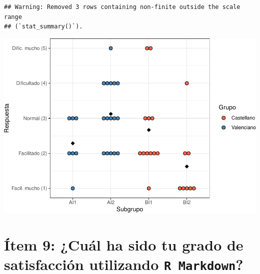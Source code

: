 \documentclass[
]{article}
\newenvironment{Shaded}{\begin{snugshade}}{\end{snugshade}}
\newcommand{\AttributeTok}[1]{\textcolor[rgb]{0.13,0.29,0.53}{#1}}
\newcommand{\FunctionTok}[1]{\textcolor[rgb]{0.13,0.29,0.53}{\textbf{#1}}}
\newcommand{\NormalTok}[1]{#1}
\newcommand{\OtherTok}[1]{\textcolor[rgb]{0.56,0.35,0.01}{#1}}
\newcommand{\SpecialCharTok}[1]{\textcolor[rgb]{0.81,0.36,0.00}{\textbf{#1}}}
\begin{document}
\begin{verbatim}
## Warning: Removed 3 rows containing non-finite outside the scale range
## (`stat_summary()`).
\end{verbatim}

\includegraphics{informe_files/figure-latex/unnamed-chunk-9-1.pdf}

\hypertarget{uxedtem-9-cuuxe1l-ha-sido-tu-grado-de-satisfacciuxf3n-utilizando}{%
\section{\texorpdfstring{Ítem 9: ¿Cuál ha sido tu grado de satisfacción
utilizando
\texttt{R Markdown}?}{Ítem 9: ¿Cuál ha sido tu grado de satisfacción utilizando ?}}\label{uxedtem-9-cuuxe1l-ha-sido-tu-grado-de-satisfacciuxf3n-utilizando}}

\begin{Shaded}
\end{Shaded}
\end{document}
